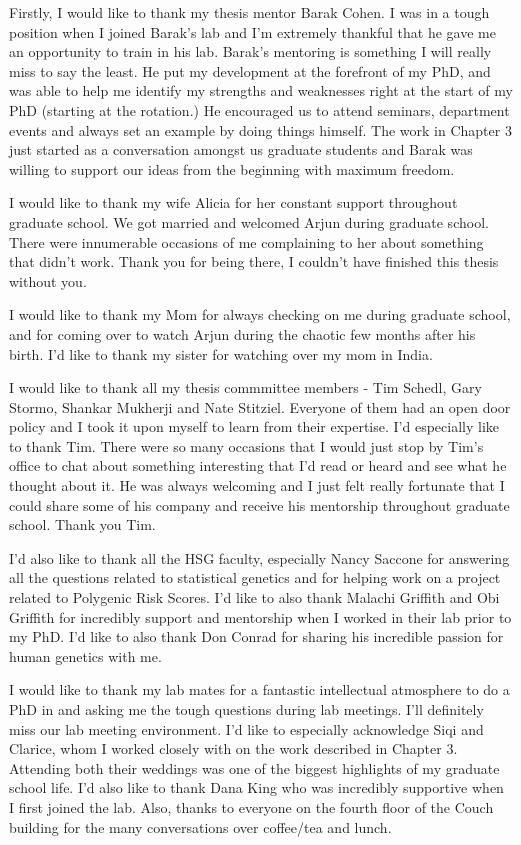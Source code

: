 \thesisacknowledgments

Firstly, I would like to thank my thesis mentor Barak Cohen. I was in a tough position when I joined Barak's lab and I'm extremely thankful that he gave me an opportunity to train in his lab. Barak's mentoring is something I will really miss to say the least. He put my development at the forefront of my PhD, and was able to help me identify my strengths and weaknesses right at the start of my PhD (starting at the rotation.) He encouraged us to attend seminars, department events and always set an example by doing things himself. The work in Chapter 3 just started as a conversation amongst us graduate students and Barak was willing to support our ideas from the beginning with maximum freedom. 

I would like to thank my wife Alicia for her constant support throughout graduate school. We got married and welcomed Arjun during graduate school. There were innumerable occasions of me complaining to her about something that didn't work. Thank you for being there, I couldn't have finished this thesis without you.

I would like to thank my Mom for always checking on me during graduate school, and for coming over to watch Arjun during the chaotic few months after his birth. I'd like to thank my sister for watching over my mom in India.

I would like to thank all my thesis commmittee members - Tim Schedl, Gary Stormo, Shankar Mukherji and Nate Stitziel. Everyone of them had an open door policy and I took it upon myself to learn from their expertise. I'd especially like to thank Tim. There were so many occasions that I would just stop by Tim's office to chat about something interesting that I'd read or heard and see what he thought about it. He was always welcoming and I just felt really fortunate that I could share some of his company and receive his mentorship throughout graduate school. Thank you Tim.

I'd also like to thank all the HSG faculty, especially Nancy Saccone for answering all the questions related to statistical genetics and for helping work on a project related to Polygenic Risk Scores. I'd like to also thank Malachi Griffith and Obi Griffith for incredibly support and mentorship when I worked in their lab prior to my PhD. I'd like to also thank Don Conrad for sharing his incredible passion for human genetics with me.

I would like to thank my lab mates for a fantastic intellectual atmosphere to do a PhD in and asking me the tough questions during lab meetings. I'll definitely miss our lab meeting environment. I'd like to especially acknowledge Siqi and Clarice, whom I worked closely with on the work described in Chapter 3. Attending both their weddings was one of the biggest highlights of my graduate school life. I'd also like to thank Dana King who was incredibly supportive when I first joined the lab. Also, thanks to everyone on the fourth floor of the Couch building for the many conversations over coffee/tea and lunch.

